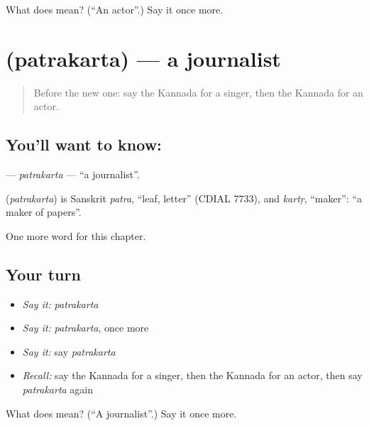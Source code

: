 \begin{tcolorbox}[breakable,colback=teal!4,colframe=teal!35!black,title={Before you move on}]
What does  mean? (\textquotedblleft{}An actor\textquotedblright{}.) Say it once more.
\end{tcolorbox}
\section[\texorpdfstring{\kn{ಪತ್ರಕರ್ತ} (patrakarta)}{ಪತ್ರಕರ್ತ (patrakarta)}]{ (patrakarta) — a journalist}

\label{lesson:KA-C305-patrakarta}



\begin{quote}
Before the new one: say the Kannada for a singer, then the Kannada for an actor.
\end{quote}

\subsection*{You'll want to know: }
\textbf{} — \emph{patrakarta} — \textquotedblleft{}a journalist\textquotedblright{}.

\begin{cousinweb}
\textbf{} (\emph{patrakarta}) is Sanskrit \emph{patra}, \textquotedblleft{}leaf, letter\textquotedblright{} (CDIAL 7733), and \emph{kartṛ}, \textquotedblleft{}maker\textquotedblright{}: \textquotedblleft{}a maker of papers\textquotedblright{}.
\end{cousinweb}

\begin{grammarlens}[title={What you've built}]
One more word for this chapter.
\end{grammarlens}

\subsection*{Your turn}
\begin{itemize}
\raggedright
  \item \emph{Say it:} \emph{patrakarta}
  \item \emph{Say it:} \emph{patrakarta}, once more
  \item \emph{Say it:} say \emph{patrakarta}
  \item \emph{Recall:} say the Kannada for a singer, then the Kannada for an actor, then say \emph{patrakarta} again
\end{itemize}

\begin{tcolorbox}[breakable,colback=teal!4,colframe=teal!35!black,title={Before you move on}]
What does  mean? (\textquotedblleft{}A journalist\textquotedblright{}.) Say it once more.
\end{tcolorbox}
